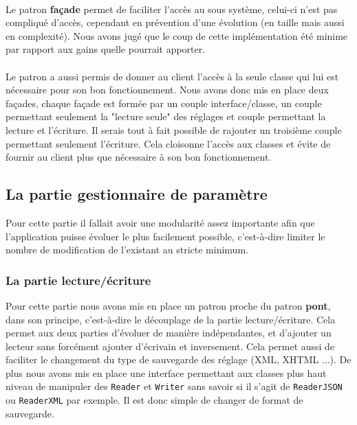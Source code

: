 \documentclass[12pt]{article}
\begin{document}
	\paragraph{}
	Le patron \textbf{façade} permet de faciliter l'accès au sous système, celui-ci n'est pas compliqué d'accès, cependant en prévention d'une évolution (en taille mais aussi en complexité). Nous avons jugé que le coup de cette implémentation été minime par rapport aux gains quelle pourrait apporter.
	
	\paragraph{}
	Le patron a aussi permis de donner au client l'accès à la seule classe qui lui est nécessaire pour son bon fonctionnement. Nous avons donc mis en place deux façades, chaque façade est formée par un couple interface/classe, un couple permettant seulement la "lecture seule" des réglages et couple permettant la lecture et l'écriture. Il serais tout à fait possible de rajouter un troisième couple permettant seulement l'écriture. Cela cloisonne l'accès aux classes et évite de fournir au client plus que nécessaire à son bon fonctionnement. 
	
	\newpage
	\subsection{La partie gestionnaire de paramètre}
	
	Pour cette partie il fallait avoir une modularité assez importante afin que l'application puisse évoluer le plus facilement possible, c'est-à-dire limiter le nombre de modification de l'existant au stricte minimum.
	
	\subsubsection{La partie lecture/écriture}
	
		Pour cette partie nous avons mis en place un patron proche du patron \textbf{pont}, dans son principe, c'est-à-dire le découplage de la partie lecture/écriture. Cela permet aux deux parties d'évoluer de manière indépendantes, et d'ajouter un lecteur sans forcément ajouter d'écrivain et inversement. Cela permet aussi de faciliter le changement du type de sauvegarde des réglage (XML, XHTML ...). De plus nous avons mis en place une interface permettant aux classes plus haut niveau de manipuler des \verb+Reader+ et \verb+Writer+ sans savoir si il s'agit de \verb+ReaderJSON+ ou \verb+ReaderXML+ par exemple. Il est donc simple de changer de format de sauvegarde.
		
\end{document}
